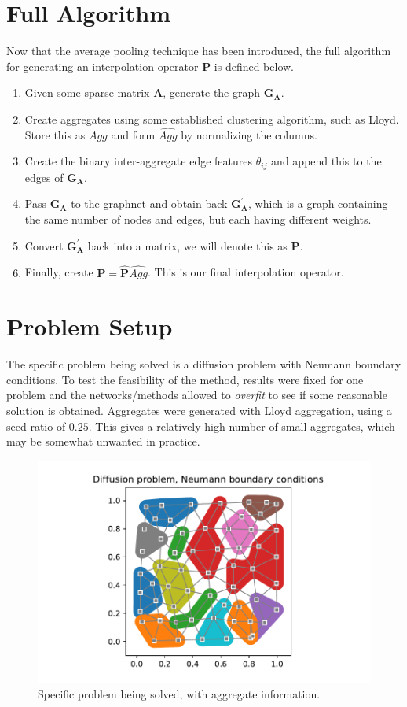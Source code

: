 \documentclass{article}
\newcommand{\mat}[1]{\bm{{#1}}}
\begin{document}
\section{Full Algorithm}
Now that the average pooling technique has been introduced, the full algorithm for generating an interpolation operator $\mat{P}$ is defined below.
\begin{enumerate}
\item Given some sparse matrix $\mat{A}$, generate the graph $\mat{G}_{\mat{A}}$.
\item Create aggregates using some established clustering algorithm, such as Lloyd.  Store this as $Agg$ and form $\hat{Agg}$ by normalizing the columns.
\item Create the binary inter-aggregate edge features $\theta_{ij}$ and append this to the edges of $\mat{G}_{\mat{A}}$.
\item Pass $\mat{G}_{\mat{A}}$ to the graphnet and obtain back $\mat{G}^\prime_{\mat{A}}$, which is a graph containing the same number of nodes and edges, but each having different weights.
\item Convert $\mat{G}^\prime_{\mat{A}}$ back into a matrix, we will denote this as $\mat{\hat{P}}$.
\item Finally, create $\mat{P}=\mat{\hat{P}}\hat{Agg}$.  This is our final interpolation operator.
\end{enumerate}

\section{Problem Setup}
The specific problem being solved is a diffusion problem with Neumann boundary conditions.  To test the feasibility of the method, results were fixed for one problem and the networks/methods allowed to \textit{overfit} to see if some reasonable solution is obtained.  Aggregates were generated with Lloyd aggregation, using a seed ratio of $0.25$.  This gives a relatively high number of small aggregates, which may be somewhat unwanted in practice.

\begin{figure}[h]
  \includegraphics[width=\textwidth]{figures/diffusion-lloyd-aggregates.pdf}
  \caption{Specific problem being solved, with aggregate information.}
  \label{fig:lloyd_aggregates}
\end{figure}
\end{document}
